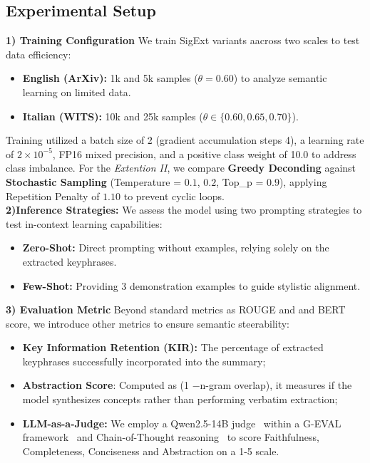 \documentclass[conference]{IEEEtran}
\begin{document}
\subsection{Experimental Setup} \label{sec:exp_config}
\textbf{1) Training Configuration} 
We train SigExt variants aacross two scales to test data efficiency:
\begin{itemize}
    \item \textbf{English (ArXiv):} 1k and 5k samples ($\theta=0.60$) to analyze semantic learning on limited data.
    \item \textbf{Italian (WITS):} 10k and 25k samples ($\theta \in \{0.60, 0.65, 0.70\}$).
\end{itemize}
 Training utilized a batch size of 2 (gradient accumulation steps 4), a learning rate of $2 \times 10^{-5}$, FP16 mixed precision, and a positive class weight of 10.0 to address class imbalance. For the \textit{Extention II}, we compare \textbf{Greedy Deconding} against \textbf{Stochastic Sampling} (Temperature = $0.1$, $0.2$, Top\_p = $0.9$), applying Repetition Penalty of $1.10$ to prevent cyclic loops.\\
 \textbf{2)Inference Strategies:} We assess the model using two prompting strategies to test in-context learning capabilities:
\begin{itemize}
    \item \textbf{Zero-Shot:} Direct prompting without examples, relying solely on the extracted keyphrases.
    \item \textbf{Few-Shot:} Providing 3 demonstration examples to guide stylistic alignment.
\end{itemize}
 \textbf{3) Evaluation Metric} Beyond standard metrics as ROUGE and and BERT score, we introduce other metrics to ensure semantic steerability: 
 \begin{itemize}
     \item \textbf{Key Information Retention (KIR):} The percentage of extracted keyphrases successfully incorporated into the summary;
     \item  \textbf{Abstraction Score}: Computed as  (1 −n-gram overlap), it measures if the model synthesizes concepts rather than performing verbatim extraction;
     \item \textbf{LLM-as-a-Judge:} We employ a Qwen2.5-14B judge~\cite{goyal2022news} within a G-EVAL framework~\cite{microsofteval} and Chain-of-Thought reasoning~\cite{CoT} to score Faithfulness, Completeness, Conciseness and Abstraction on a 1-5 scale.
 \end{itemize}
\end{document}
